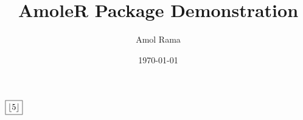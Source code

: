 \documentclass{article}
\title{AmoleR Package Demonstration}
\author{Amol Rama}
\date{\today}
\begin{document}
\maketitle

$\boxed{\left\lfloor {5}\right\rfloor}$
\end{document}
